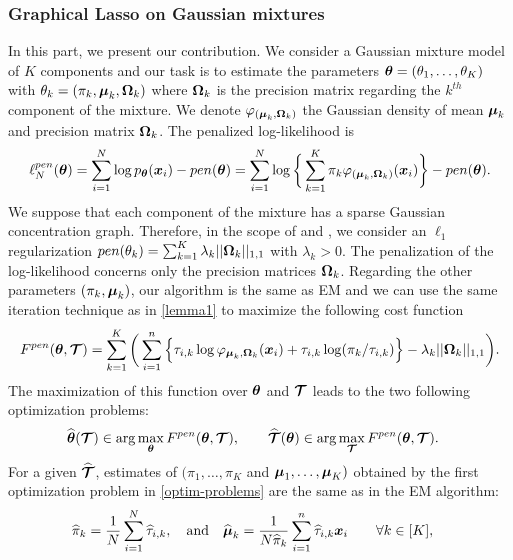 \subsubsection{Graphical Lasso on Gaussian mixtures}
In this part, we present our contribution. We consider a Gaussian mixture model of $K$ components and our task is to estimate the parameters ${\boldsymbol\theta}=(\theta_1,\dots,\theta_K)$ with $\theta_k=(\pi_k, \boldsymbol\mu_k, \boldsymbol\Omega_k)$ where $\boldsymbol\Omega_k$ is the precision matrix regarding the $k^{th}$ component of the mixture. We denote $\varphi_{(\boldsymbol\mu_{k},\boldsymbol\Omega_{k})}$ the Gaussian density of mean $\boldsymbol\mu_k$ and precision matrix $\boldsymbol\Omega_k$. The penalized log-likelihood is
\begin{equation}
\label{pen-log-likelihood}
\ell_N^{pen}({\boldsymbol\theta})=\sum_{i=1}^{N}\log p_{{\boldsymbol\theta}}(\boldsymbol x_i)-pen({\boldsymbol\theta})= \sum_{i=1}^{N}\log \bigg\{ \sum_{k=1}^K\pi_k\varphi_{(\boldsymbol\mu_{k},\boldsymbol\Omega_{k})}(\boldsymbol x_i)\bigg\} -pen({\boldsymbol\theta}).
\end{equation}
We suppose that each component of the mixture has a sparse Gaussian concentration graph. Therefore, in the scope of \citep{banerjee} and \citep{glasso07}, we consider an $\ell_1$ regularization $pen(\theta_k)=\sum_{k=1}^K\lambda_k||\boldsymbol\Omega_k||_{1,1}$ with $\lambda_k >0$. The penalization of the log-likelihood concerns only the precision matrices $\boldsymbol\Omega_k$. Regarding the other parameters $(\pi_k, \boldsymbol\mu_k)$, our algorithm is the same as EM and we can use the same iteration technique as in \cref{lemma1} to maximize the following cost function
\begin{equation}
\label{cost_fun_pen}
F^{pen}({\boldsymbol\theta},\boldsymbol{\mathcal T})  = \sum_{k=1}^K \bigg(\sum_{i=1}^{n} \Big\{\tau_{i,k}\log\varphi_{\boldsymbol\mu_{k},\boldsymbol\Omega_{k}}(\boldsymbol x_i)+\tau_{i,k}
    \log(\pi_k/\tau_{i,k})\Big\}-\lambda_k||\boldsymbol\Omega_k||_{1,1}\bigg).
\end{equation}
The maximization of this function over ${\boldsymbol\theta}$ and $\boldsymbol{\mathcal T}$ leads to the two following optimization problems:
\begin{align}
\label{optim-problems}
\widehat{{\boldsymbol\theta}}(\boldsymbol{\mathcal T})&\in \arg\max_{{\boldsymbol\theta}} F^{pen}({\boldsymbol\theta},\boldsymbol{\mathcal T}),\qquad \widehat{\boldsymbol{\mathcal T}}({\boldsymbol\theta})\in \arg\max_{\boldsymbol{\mathcal T}} F^{pen}({\boldsymbol\theta},\boldsymbol{\mathcal T}).
\end{align}
For a given $\widehat{\boldsymbol{\mathcal T}}$, estimates of $(\pi_1,\dots,\pi_K$ and $\boldsymbol\mu_1,\dots,\boldsymbol\mu_K)$ obtained by the first optimization problem in \cref{optim-problems} are the same as in the EM algorithm:
\begin{align}
\label{em-sols}
\widehat\pi_k     &= \frac1N\sum_{i=1}^N \widehat\tau_{i,k},\quad\text{and}\quad\widehat{\boldsymbol\mu}_k = \frac1{N\widehat\pi_k}\sum_{i=1}^n \widehat\tau_{i,k}\boldsymbol x_i \qquad \forall k\in[K],
\end{align}

